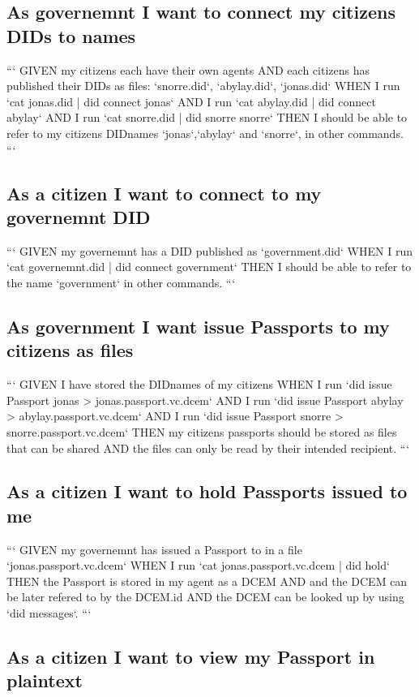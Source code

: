 \subsection{As governemnt I want to connect my citizens DIDs to names}

```
GIVEN my citizens each have their own agents
AND   each citizens has published their DIDs as files: `snorre.did`, `abylay.did`, `jonas.did`
WHEN  I run `cat jonas.did | did connect jonas`
AND   I run `cat abylay.did | did connect abylay`
AND   I run `cat snorre.did | did snorre snorre`
THEN  I should be able to refer to my citizens DIDnames `jonas`,`abylay` and `snorre`, in other commands.
```

\subsection{As a citizen I want to connect to my governemnt DID}

```
GIVEN my governemnt has a DID published as `government.did`
WHEN  I run `cat governemnt.did | did connect government`
THEN  I should be able to refer to the name `government` in other commands.
```

\subsection{As government I want issue Passports to my citizens as files}

```
GIVEN I have stored the DIDnames of my citizens
WHEN  I run `did issue Passport jonas > jonas.passport.vc.dcem`
AND   I run `did issue Passport abylay > abylay.passport.vc.dcem`
AND   I run `did issue Passport snorre > snorre.passport.vc.dcem`
THEN  my citizens passports should be stored as files that can be shared
AND   the files can only be read by their intended recipient.
```

\subsection{As a citizen I want to hold Passports issued to me}

```
GIVEN my governemnt has issued a Passport to in a file `jonas.passport.vc.dcem`
WHEN  I run `cat jonas.passport.vc.dcem | did hold`
THEN  the Passport is stored in my agent as a DCEM
AND   and the DCEM can be later refered to by the DCEM.id
AND   the DCEM can be looked up by using `did messages`.
```

\subsection{As a citizen I want to view my Passport in plaintext}

